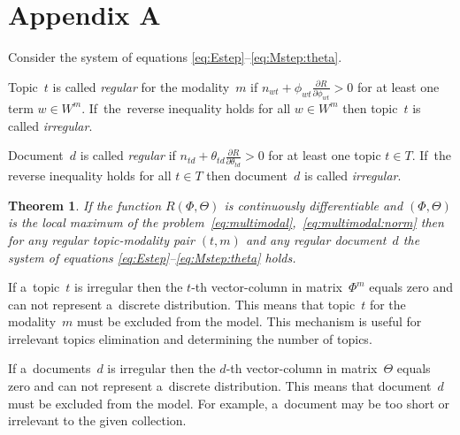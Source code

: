 \documentclass{sig-alternate}
\newtheorem{theorem}{Theorem}
\begin{document}

\newpage
\section*{Appendix A}

Consider the system of equations \eqref{eq:Estep}--\eqref{eq:Mstep:theta}.

Topic~$t$ is called \emph{regular} for the modality~$m$
if ${n_{wt} + \phi_{wt} \frac{\partial R}{\partial \phi_{wt}} > 0}$
for at least one term ${w\in W^m}$.
If~the~reverse inequality holds for all ${w\in W^m}$ then
topic~$t$ is called \emph{irregular}.

Document~$d$ is called \emph{regular}
if ${n_{td} + \theta_{td} \frac{\partial R}{\partial \theta_{td}} > 0}$
for at least one topic ${t\in T}$.
If~the reverse inequality holds for all ${t\in T}$ then
document~$d$ is called \emph{irregular}.

\begin{theorem}
\label{th:multimodal}
    If the function $R(\Phi,\Theta)$ is continuously differentiable
    and $(\Phi,\Theta)$ is the local maximum
    of the problem~\eqref{eq:multimodal},~\eqref{eq:multimodal:norm}
    then for any regular topic-modality pair $(t,m)$ and any regular document~$d$
    the system of equations \eqref{eq:Estep}--\eqref{eq:Mstep:theta} holds.
\end{theorem}

\begin{note}
    If a~topic~$t$ is irregular
    then the $t$-th vector-column in matrix~$\Phi^m$ equals zero
    and can not represent a~discrete distribution.
    This means that topic~$t$ for the modality~$m$ must be excluded from the model.
    This mechanism is useful for irrelevant topics elimination and determining the number of topics.
\end{note}
\begin{note}
    If a~documents~$d$ is irregular
    then the $d$-th vector-column in matrix~$\Theta$ equals zero
    and can not represent a~discrete distribution.
    This means that document~$d$ must be excluded from the model.
    For example, a~document may be too short or irrelevant to the given collection.
\end{note}
\end{document}
